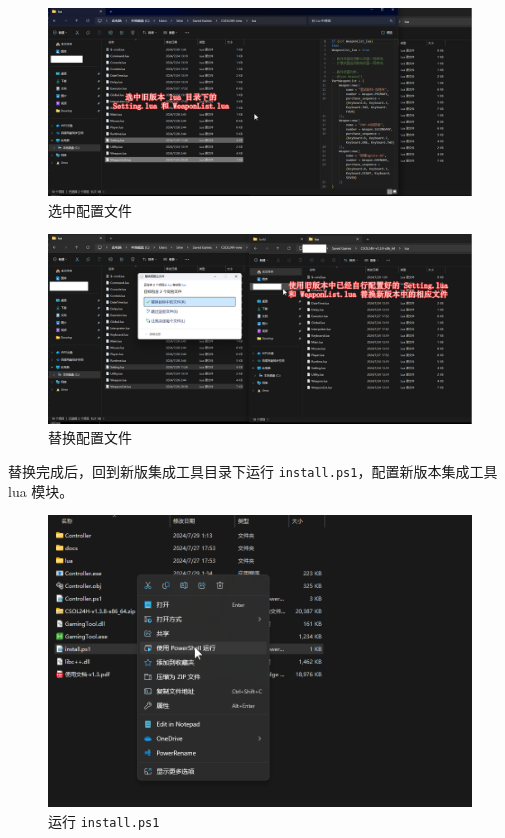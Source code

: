 \begin{figure}[H]
    \Centering
    \includegraphics[width=\textwidth]{docs/assets/update/replace_01.png}
    \caption{选中配置文件}
\end{figure}

\begin{figure}[H]
    \Centering
    \includegraphics[width=\textwidth]{docs/assets/update/replace_02.png}
    \caption{替换配置文件}
\end{figure}

替换完成后，回到新版集成工具目录下运行 \lstinline{install.ps1}，配置新版本集成工具 lua 模块。

\begin{figure}[H]
    \Centering
    \includegraphics[width=\textwidth]{docs/assets/update/run_install.png}
    \caption{运行 \lstinline{install.ps1}}
\end{figure}

